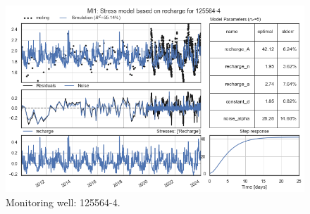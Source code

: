 \begin{figure}[htbp]
    \hfill
    \begin{minipage}{0.32\textwidth}
        \centering
        \includegraphics[width=\linewidth]{frontmatter/Heijplaat-fig/3.png}
        \caption{Monitoring well: 125564-4.}
        \label{SM: 125564-4}
    \end{minipage}
\end{figure}

